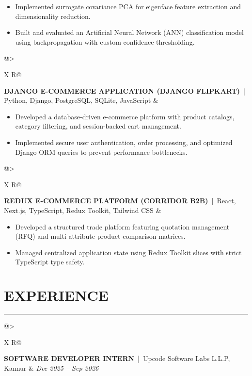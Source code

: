 \documentclass[a4paper,9pt]{article}
\makeatletter
\newcommand{\sectionline}{
    \vspace{0pt}
    \hrule
    \vspace{1.5pt}
}
\newcommand{\projectheading}[3]{
    \noindent
    \begin{tabularx}{\textwidth}{@{}>{\raggedright\arraybackslash}X R@{}}
        \textbf{#1} \,|\, #2
        &
        #3
    \end{tabularx}
    \vspace{-2pt}
}
\newcommand{\experienceheading}[3]{
    \noindent
    \begin{tabularx}{\textwidth}{@{}>{\raggedright\arraybackslash}X R@{}}
        \textbf{#1} \,|\, #2
        &
        \textit{#3}
    \end{tabularx}
    \vspace{-2pt}
}
\makeatother
\begin{document}
\begin{itemize}
    \item Implemented surrogate covariance PCA for eigenface feature extraction and dimensionality reduction.
    \item Built and evaluated an Artificial Neural Network (ANN) classification model using backpropagation with custom confidence thresholding.
\end{itemize}


\projectheading
{DJANGO E-COMMERCE APPLICATION (DJANGO FLIPKART)}
{Python, Django, PostgreSQL, SQLite, JavaScript}
{}

\begin{itemize}
    \item Developed a database-driven e-commerce platform with product catalogs, category filtering, and session-backed cart management.
    \item Implemented secure user authentication, order processing, and optimized Django ORM queries to prevent performance bottlenecks.
\end{itemize}


\projectheading
{REDUX E-COMMERCE PLATFORM (CORRIDOR B2B)}
{React, Next.js, TypeScript, Redux Toolkit, Tailwind CSS}
{}

\begin{itemize}
    \item Developed a structured trade platform featuring quotation management (RFQ) and multi-attribute product comparison matrices.
    \item Managed centralized application state using Redux Toolkit slices with strict TypeScript type safety.
\end{itemize}


\section*{EXPERIENCE}
\sectionline

\experienceheading
{SOFTWARE DEVELOPER INTERN}
{Upcode Software Labs L.L.P, Kannur}
{Dec 2025 -- Sep 2026}
\end{document}

